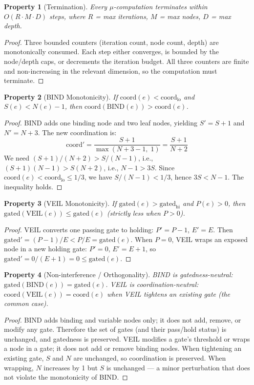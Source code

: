 \documentclass[sigconf,nonacm]{acmart}
\newtheorem{property}{Property}
\begin{document}
\begin{property}[Termination]
Every $\mu$-computation terminates within $O(R \cdot M \cdot D)$
steps, where $R$ = max iterations, $M$ = max nodes, $D$ = max depth.
\end{property}
\begin{proof}
Three bounded counters (iteration count, node count, depth) are
monotonically consumed. Each step either converges, is bounded by
the node/depth caps, or decrements the iteration budget. All three
counters are finite and non-increasing in the relevant dimension,
so the computation must terminate.
\end{proof}

\begin{property}[BIND Monotonicity]\label{prop:bind}
If $\mathrm{coord}(e) < \mathrm{coord}_{\mathrm{lo}}$ and $S(e) < N(e) - 1$,
then $\mathrm{coord}(\mathrm{BIND}(e)) > \mathrm{coord}(e)$.
\end{property}
\begin{proof}
BIND adds one binding node and two leaf nodes, yielding $S' = S + 1$
and $N' = N + 3$. The new coordination is:
\[
\mathrm{coord}' = \frac{S + 1}{\max(N + 3 - 1,\; 1)} = \frac{S + 1}{N + 2}
\]
We need $(S + 1)/(N + 2) > S/(N - 1)$, i.e.,
$(S+1)(N-1) > S(N+2)$, i.e., $N - 1 > 3S$.
Since $\mathrm{coord}(e) < \mathrm{coord}_{\mathrm{lo}} \leq 1/3$,
we have $S/(N-1) < 1/3$, hence $3S < N - 1$. The inequality holds.
\end{proof}

\begin{property}[VEIL Monotonicity]\label{prop:veil}
If $\mathrm{gated}(e) > \mathrm{gated}_{\mathrm{hi}}$ and $P(e) > 0$,
then $\mathrm{gated}(\mathrm{VEIL}(e)) \leq \mathrm{gated}(e)$
(strictly less when $P > 0$).
\end{property}
\begin{proof}
VEIL converts one passing gate to holding: $P' = P - 1$, $E' = E$.
Then $\mathrm{gated}' = (P-1)/E < P/E = \mathrm{gated}(e)$.
When $P = 0$, VEIL wraps an exposed node in a new holding gate:
$P' = 0$, $E' = E + 1$, so $\mathrm{gated}' = 0/(E+1) = 0 \leq
\mathrm{gated}(e)$.
\end{proof}

\begin{property}[Non-interference / Orthogonality]\label{prop:ortho}
BIND is gatedness-neutral:
$\mathrm{gated}(\mathrm{BIND}(e)) = \mathrm{gated}(e)$.
VEIL is coordination-neutral:
$\mathrm{coord}(\mathrm{VEIL}(e)) = \mathrm{coord}(e)$ when VEIL
tightens an existing gate (the common case).
\end{property}
\begin{proof}
BIND adds binding and variable nodes only; it does not add, remove, or
modify any gate. Therefore the set of gates (and their pass/hold status)
is unchanged, and gatedness is preserved.
VEIL modifies a gate's threshold or wraps a node in a gate; it does not
add or remove binding nodes. When tightening an existing gate, $S$ and
$N$ are unchanged, so coordination is preserved. When wrapping, $N$
increases by 1 but $S$ is unchanged --- a minor perturbation that does
not violate the monotonicity of BIND.
\end{proof}
\end{document}
